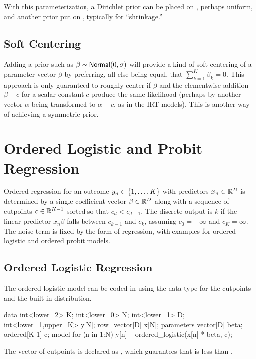 With this parameterization, a Dirichlet prior can be placed on
, perhaps uniform, and another prior put on
, typically for ``shrinkage.''  


\subsection{Soft Centering}

Adding a prior such as $\beta \sim \distro{Normal}(0,\sigma)$ will provide a kind
of soft centering of a parameter vector $\beta$ by preferring, all
else being equal, that $\sum_{k=1}^K \beta_k = 0$.  This approach is only
guaranteed to roughly center  if $\beta$ and the elementwise addition $\beta + c$
for a scalar constant $c$ produce the same likelihood (perhaps by
another vector $\alpha$ being transformed to $\alpha - c$, as in the
IRT models).  This is another way of achieving a symmetric prior.


\section{Ordered Logistic and Probit Regression}\label{ordered-logistic.section}

Ordered regression for an outcome $y_n \in \setlist{1,\ldots,K}$ with
predictors $x_n \in \reals^D$ is determined by a single coefficient
vector $\beta \in \reals^D$ along with a sequence of cutpoints $c \in
\reals^{K-1}$ sorted so that $c_d < c_{d+1}$.  The discrete output is
$k$ if the linear predictor $x_n \beta$ falls between $c_{k-1}$ and
$c_k$, assuming $c_0 = -\infty$ and $c_K = \infty$.  The noise term is
fixed by the form of regression, with examples for ordered logistic
and ordered probit models.  

\subsection{Ordered Logistic Regression}

The ordered logistic model can be coded in \Stan using the
 data type for the cutpoints and the built-in
 distribution.
%

\begin{stancode}
data {
  int<lower=2> K;
  int<lower=0> N;
  int<lower=1> D;
  int<lower=1,upper=K> y[N];
  row_vector[D] x[N];
} 
parameters {
  vector[D] beta;
  ordered[K-1] c;
} 
model {
  for (n in 1:N)
    y[n] ~ ordered_logistic(x[n] * beta, c);
}
\end{stancode}
% 
The vector of cutpoints  is declared as ,
which guarantees that  is less than . 

